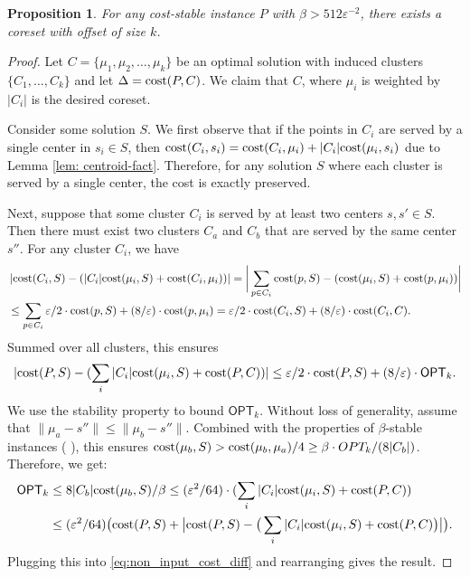 \documentclass[11pt]{article}
\newtheorem{proposition}[lemma]{Proposition}
\theoremstyle{restate}
\theoremstyle{definition}
\newcommand{\eps}{\ensuremath{\varepsilon}}
\newcommand{\cost}{\textnormal{cost}}
\newcommand{\opt}{\ensuremath{\mathsf{OPT}}}
\begin{document}
\begin{proposition}
For any cost-stable instance $P$ with $\beta > 512\varepsilon^{-2}$, there exists a coreset with offset of size $k$.
\end{proposition}
\begin{proof}
    Let $C=\{\mu_1,\mu_2,\ldots,\mu_k\}$ be an optimal solution with induced clusters $\{C_1,\ldots,C_k\}$ and let $\Delta = \cost(P,C)$. We claim that $C$, where $\mu_i$ is weighted by $|C_i|$ is the desired coreset.

    Consider some solution $S$. We first observe that if the points in $C_i$ are served by a single center in $s_i\in S$, then $\cost(C_i,s_i) = \cost(C_i,\mu_i) + |C_i|\cost(\mu_i,s_i)$ due to Lemma \ref{lem: centroid-fact}. Therefore, for any solution $S$ where each cluster is served by a single center, the cost is exactly preserved.

    Next, suppose that some cluster $C_i$ is served by at least two centers $s,s'\in S$. Then there must exist two clusters $C_a$ and $C_b$ that are served by the same center $s''$.
    For any cluster $C_i$, we have
    \begin{align*}
& \left\vert \cost(C_i,S) - (|C_i|\cost(\mu_i,S) + \cost(C_i, \mu_i))  \right\vert =        \bigg\vert \sum_{p\in C_i} \cost(p,S) - (\cost(\mu_i,S) + \cost(p,\mu_i)) \bigg\vert\\
&\leq   \sum_{p\in C_i} \varepsilon/2\cdot \cost(p,S) + (8/\varepsilon)\cdot \cost(p,\mu_i) = \varepsilon/2\cdot \cost(C_i,S) + (8/\varepsilon)\cdot \cost(C_i,C).
    \end{align*}
Summed over all clusters, this ensures 
\begin{equation}
    \label{eq:non_input_cost_diff}
    | \cost(P,S) - (\sum_i |C_i|\cost(\mu_i,S) + \cost(P, C))  | \leq \varepsilon/2\cdot \cost(P,S) + (8/\varepsilon)\cdot \opt_k.
\end{equation}
We use the stability property to bound $\opt_k$.
Without loss of generality, assume that $\|\mu_a - s''\| \leq \|\mu_b-s''\|$.
Combined with the properties of $\beta$-stable instances ( ), this ensures $\cost(\mu_b,S) > \cost(\mu_b,\mu_a)/4 \geq \beta\cdot OPT_k/(8|C_b|)$. 
Therefore, we get:
\begin{align*}
    \opt_k &\leq  8 |C_b|\cost(\mu_b, S)/\beta
    \leq (\eps^2/64) \cdot (\sum_i |C_i|\cost(\mu_i,S) + \cost(P, C))\\
    &\leq  (\eps^2/64) \big(\cost(P, S) + \big\vert \cost(P,S) - \big(\sum_i |C_i|\cost(\mu_i,S) + \cost(P, C)\big)  \big\vert\big).
\end{align*}
 Plugging this into \eqref{eq:non_input_cost_diff} and rearranging gives the result.
\end{proof}
\end{document}
